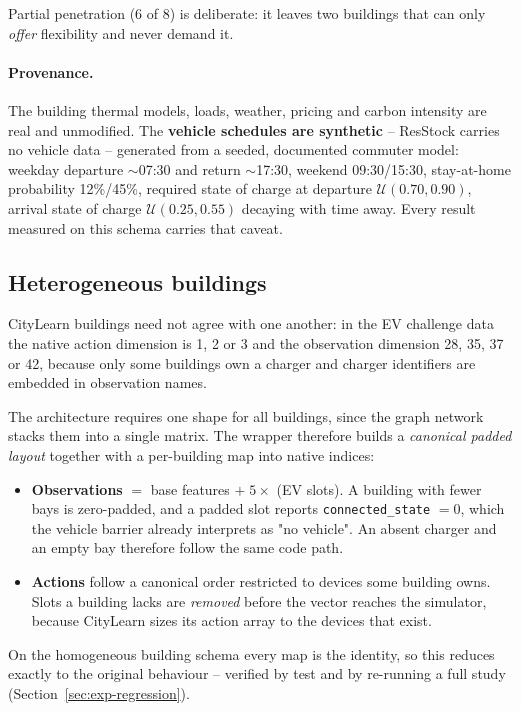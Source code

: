\documentclass[11pt]{article}
\begin{document}
Partial penetration (6 of 8) is deliberate: it leaves two buildings that can
only \emph{offer} flexibility and never demand it.

\paragraph{Provenance.} The building thermal models, loads, weather, pricing and
carbon intensity are real and unmodified. The \textbf{vehicle schedules are
synthetic} -- ResStock carries no vehicle data -- generated from a seeded,
documented commuter model: weekday departure $\sim$07:30 and return $\sim$17:30,
weekend 09:30/15:30, stay-at-home probability 12\%/45\%, required state of
charge at departure $\mathcal U(0.70, 0.90)$, arrival state of charge
$\mathcal U(0.25, 0.55)$ decaying with time away. Every result measured on this
schema carries that caveat.

\subsection{Heterogeneous buildings}

CityLearn buildings need not agree with one another: in the EV challenge data
the native action dimension is 1, 2 or 3 and the observation dimension 28, 35,
37 or 42, because only some buildings own a charger and charger identifiers are
embedded in observation names.

The architecture requires one shape for all buildings, since the graph network
stacks them into a single matrix. The wrapper therefore builds a \emph{canonical
padded layout} together with a per-building map into native indices:

\begin{itemize}[nosep]
\item \textbf{Observations} $=$ base features $+\;5 \times$ (EV slots). A
building with fewer bays is zero-padded, and a padded slot reports
\texttt{connected\_state} $=0$, which the vehicle barrier already interprets as
"no vehicle". An absent charger and an empty bay therefore follow the same code
path.
\item \textbf{Actions} follow a canonical order restricted to devices some
building owns. Slots a building lacks are \emph{removed} before the vector
reaches the simulator, because CityLearn sizes its action array to the devices
that exist.
\end{itemize}

On the homogeneous building schema every map is the identity, so this reduces
exactly to the original behaviour -- verified by test and by re-running a full
study (Section~\ref{sec:exp-regression}).
\end{document}
